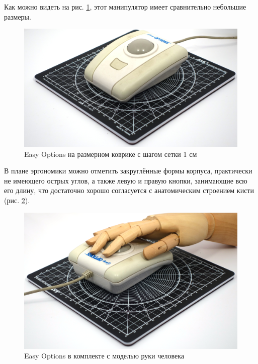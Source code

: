 \documentclass[11pt, a4paper]{article}
\begin{document}
Как можно видеть на рис. \ref{fig:EasyOptionsSize}, этот манипулятор имеет сравнительно небольшие размеры.

\begin{figure}[h]
    \centering
    \includegraphics[scale=0.43]{1993_easy_options_trackball/size_30.jpg}
    \caption{Easy Options на размерном коврике с шагом сетки 1 см}
    \label{fig:EasyOptionsSize}
\end{figure}

В плане эргономики можно отметить закруглённые формы корпуса, практически не имеющего острых углов, а также левую и правую кнопки, занимающие всю его длину, что достаточно хорошо согласуется с анатомическим строением кисти (рис. \ref{fig:EasyOptionsHand}).

\begin{figure}[h]
    \centering
    \includegraphics[scale=0.43]{1993_easy_options_trackball/hand_30.jpg}
    \caption{Easy Options в комплекте с моделью руки человека}
    \label{fig:EasyOptionsHand}
\end{figure}
\end{document}
